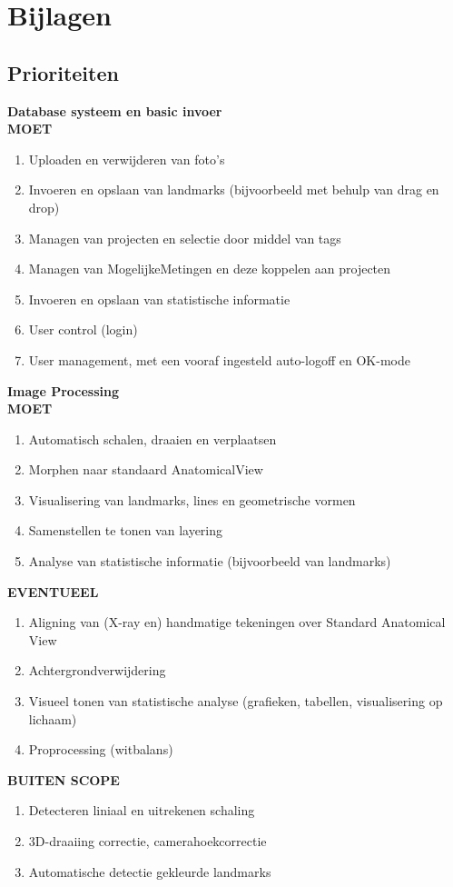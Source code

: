 \chapter{Bijlagen}
\label{Bijlagen}

\section{Prioriteiten}
\Large{\textbf{Database systeem en basic invoer}}\\
\large{\textbf{MOET}}
\begin{enumerate}
	\item Uploaden en verwijderen van foto's
	\item Invoeren en opslaan van landmarks (bijvoorbeeld met behulp van drag en drop)
	\item Managen van projecten en selectie door middel van tags
	\item Managen van MogelijkeMetingen en deze koppelen aan projecten
	\item Invoeren en opslaan van statistische informatie
	\item User control (login)
	\item User management, met een vooraf ingesteld auto-logoff en OK-mode
\end{enumerate}
\Large{\textbf{Image Processing}}\\
\large{\textbf{MOET}}
\begin{enumerate}
	\item Automatisch schalen, draaien en verplaatsen
	\item Morphen naar standaard AnatomicalView
	\item Visualisering van landmarks, lines en geometrische vormen
	\item Samenstellen te tonen van layering
	\item Analyse van statistische informatie (bijvoorbeeld van landmarks)
\end{enumerate}
\large{\textbf{EVENTUEEL}}
\begin{enumerate}
	\item Aligning van (X-ray en) handmatige tekeningen over Standard Anatomical View
	\item Achtergrondverwijdering
	\item Visueel tonen van statistische analyse (grafieken, tabellen, visualisering op lichaam)
	\item Proprocessing (witbalans)
\end{enumerate}
\large{\textbf{BUITEN SCOPE}}
\begin{enumerate}
	\item Detecteren liniaal en uitrekenen schaling
	\item 3D-draaiing correctie, camerahoekcorrectie
	\item Automatische detectie gekleurde landmarks
\end{enumerate}

